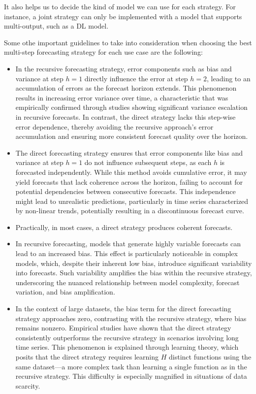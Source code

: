 \documentclass{article}
\begin{document}
It also helps us to decide the kind of model we can use for each strategy. For instance, a joint strategy
can only be implemented with a model that supports multi-output, such as a DL model.

Some othe important guidelines to take into consideration when choosing the best multi-step forecasting strategy for each use case are the following:
\begin{itemize}
    \item In the recursive forecasting strategy, error components such as bias and variance at step \(h = 1\) directly influence the error at step \(h = 2\), leading to an accumulation of errors as the forecast horizon extends. This phenomenon results in increasing error variance over time, a characteristic that was empirically confirmed through studies showing significant variance escalation in recursive forecasts. In contrast, the direct strategy lacks this step-wise error dependence, thereby avoiding the recursive approach's error accumulation and ensuring more consistent forecast quality over the horizon.
    \item The direct forecasting strategy ensures that error components like bias and variance at step \(h = 1\) do not influence subsequent steps, as each \(h\) is forecasted independently. While this method avoids cumulative error, it may yield forecasts that lack coherence across the horizon, failing to account for potential dependencies between consecutive forecasts. This independence might lead to unrealistic predictions, particularly in time series characterized by non-linear trends, potentially resulting in a discontinuous forecast curve.
    \item Practically, in most cases, a direct strategy produces coherent forecasts.
    \item In recursive forecasting, models that generate highly variable forecasts can lead to an increased bias. This effect is particularly noticeable in complex models, which, despite their inherent low bias, introduce significant variability into forecasts. Such variability amplifies the bias within the recursive strategy, underscoring the nuanced relationship between model complexity, forecast variation, and bias amplification.
    \item In the context of large datasets, the bias term for the direct forecasting strategy approaches zero, contrasting with the recursive strategy, where bias remains nonzero. Empirical studies have shown that the direct strategy consistently outperforms the recursive strategy in scenarios involving long time series. This phenomenon is explained through learning theory, which posits that the direct strategy requires learning \(H\) distinct functions using the same dataset—a more complex task than learning a single function as in the recursive strategy. This difficulty is especially magnified in situations of data scarcity.

\end{itemize}
\end{document}
